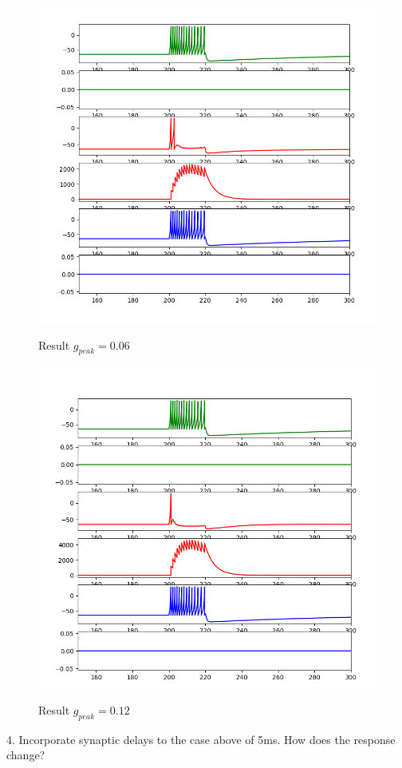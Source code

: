 \documentclass[12pt]{article}
\begin{document}
\begin{figure}[H]
  \centering
  \includegraphics[width=.8\textwidth]{h3_p1_p3_600.png} %
  \label{img} %
  \caption{Result $g_{peak} = 0.06 $}
\end{figure}
\begin{figure}[H]
  \centering
  \includegraphics[width=.8\textwidth]{h3_p1_p3_1200.png} %
  \label{img} %
  \caption{Result $g_{peak} = 0.12 $}
\end{figure}
\newpage

4. Incorporate synaptic delays to the case above of 5ms. How does the response change?
\\
\end{document}
